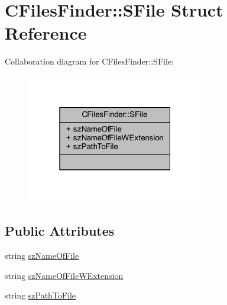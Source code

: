 \hypertarget{struct_c_files_finder_1_1_s_file}{\section{C\+Files\+Finder\+:\+:S\+File Struct Reference}
\label{struct_c_files_finder_1_1_s_file}
}


Collaboration diagram for C\+Files\+Finder\+:\+:S\+File\+:
\nopagebreak
\begin{figure}[H]
\begin{center}
\leavevmode
\includegraphics[width=220pt]{struct_c_files_finder_1_1_s_file__coll__graph}
\end{center}
\end{figure}
\subsection*{Public Attributes}
\begin{DoxyCompactItemize}
\item 
string \hyperlink{struct_c_files_finder_1_1_s_file_aaed5de486dfbdb594746e4fd13c65074}{sz\+Name\+Of\+File}
\item 
string \hyperlink{struct_c_files_finder_1_1_s_file_a7ceceb85e185f30be5476a3d150a2aba}{sz\+Name\+Of\+File\+W\+Extension}
\item 
string \hyperlink{struct_c_files_finder_1_1_s_file_aa0ec885df98370ebdd2fdb429ce76adf}{sz\+Path\+To\+File}
\end{DoxyCompactItemize}


